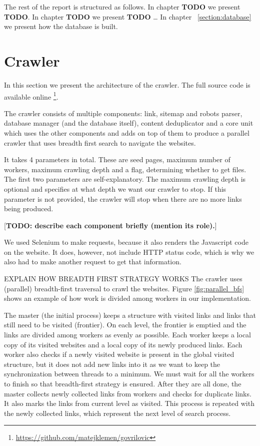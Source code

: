 \documentclass[9pt]{IEEEtran}
\begin{document}
The rest of the report is structured as follows.
In chapter \textbf{TODO} we present \textbf{TODO}.
In chapter \textbf{TODO} we present \textbf{TODO} \ldots
In chapter ~\ref{section:database} we present how the database is built.

\section{Crawler}
In this section we present the architecture of the crawler. 
The full source code is available online \footnote{\url{https://github.com/matejklemen/govrilovic}}.

The crawler consists of multiple components: link, sitemap and robots parser, database manager (and the database itself), content deduplicator and a core unit which uses the other components and adds on top of them to produce a parallel crawler that uses breadth first search to navigate the websites.

It takes 4 parameters in total. These are seed pages, maximum number of workers, maximum crawling depth and a flag, determining whether to get files. 
The first two parameters are self-explanatory.
The maximum crawling depth is optional and specifies at what depth we want our crawler to stop. 
If this parameter is not provided, the crawler will stop when there are no more links being produced.

[\textbf{TODO: describe each component briefly (mention its role).}]




We used Selenium to make requests, because it also renders the Javascript code on the website. It does, however, not include HTTP status code, which is why we also had to make another request to get that information.


EXPLAIN HOW BREADTH FIRST STRATEGY WORKS
The crawler uses (parallel) breadth-first traversal to crawl the websites. Figure \ref{fig:parallel_bfs} shows an example of how work is divided among workers in our implementation.

The master (the initial process) keeps a structure with visited links and links that still need to be visited (frontier).
On each level, the frontier is emptied and the links are divided among workers as evenly as possible.
Each worker keeps a local copy of its visited websites and a local copy of its newly produced links.
Each worker also checks if a newly visited website is present in the global visited structure, but it does not add new links into it as we want to keep the synchronization between threads to a minimum.
We must wait for all the workers to finish so that breadth-first strategy is ensured.
After they are all done, the master collects newly collected links from workers and checks for duplicate links.
It also marks the links from current level as visited.
This process is repeated with the newly collected links, which represent the next level of search process.
\end{document}
